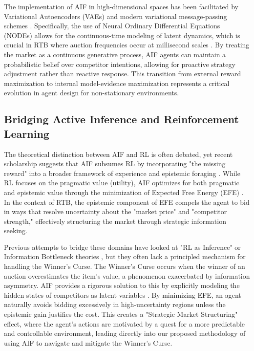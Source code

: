 The implementation of AIF in high-dimensional spaces has been facilitated by Variational Autoencoders (VAEs) and modern variational message-passing schemes \cite{ref_new_RealizingSynthe, kingma2013auto}. Specifically, the use of Neural Ordinary Differential Equations (NODEs) allows for the continuous-time modeling of latent dynamics, which is crucial in RTB where auction frequencies occur at millisecond scales \cite{chen2018neural}. By treating the market as a continuous generative process, AIF agents can maintain a probabilistic belief over competitor intentions, allowing for proactive strategy adjustment rather than reactive response. This transition from external reward maximization to internal model-evidence maximization represents a critical evolution in agent design for non-stationary environments.

\subsection{Bridging Active Inference and Reinforcement Learning}
The theoretical distinction between AIF and RL is often debated, yet recent scholarship suggests that AIF subsumes RL by incorporating "the missing reward" into a broader framework of experience and epistemic foraging \cite{ref_new_TheMissingRewar}. While RL focuses on the pragmatic value (utility), AIF optimizes for both pragmatic and epistemic value through the minimization of Expected Free Energy (EFE) \cite{parr2019generalised}. In the context of RTB, the epistemic component of EFE compels the agent to bid in ways that resolve uncertainty about the "market price" and "competitor strength," effectively structuring the market through strategic information seeking.

Previous attempts to bridge these domains have looked at "RL as Inference" \cite{levine2018reinforcement} or Information Bottleneck theories \cite{tishby2000information}, but they often lack a principled mechanism for handling the Winner's Curse. The Winner's Curse occurs when the winner of an auction overestimates the item's value, a phenomenon exacerbated by information asymmetry. AIF provides a rigorous solution to this by explicitly modeling the hidden states of competitors as latent variables \cite{ref_new_AdaptiveActiveI}. By minimizing EFE, an agent naturally avoids bidding excessively in high-uncertainty regions unless the epistemic gain justifies the cost. This creates a "Strategic Market Structuring" effect, where the agent’s actions are motivated by a quest for a more predictable and controllable environment, leading directly into our proposed methodology of using AIF to navigate and mitigate the Winner's Curse.